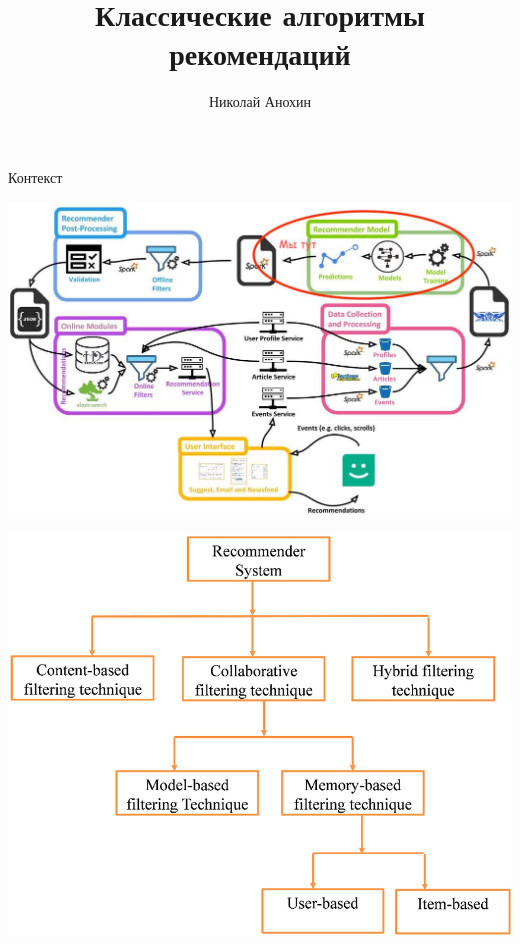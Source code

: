 \documentclass[11pt,aspectratio=169,handout=true]{beamer}
\author{Николай Анохин}
\title{Классические алгоритмы рекомендаций}
\begin{document}
{

\begin{frame}
\titlepage
\end{frame}


}

\begin{frame}{Контекст}

\begin{center}
\includegraphics[scale=0.23]{images/mendeley.jpeg}
\end{center}

\end{frame}

\begin{frame}
\begin{center}
\includegraphics[scale=0.22]{images/taxonomy.png}
\end{center}
\end{frame}
\end{document}
